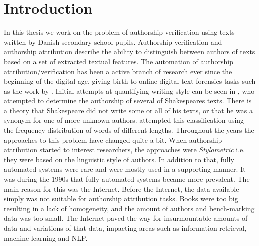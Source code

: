 %

\section{Introduction} \label{sec:introduction}


In this thesis we work on the problem of authorship verification using texts
written by Danish secondary school pupils. Authorship verification and
authorship attribution describe the ability to distinguish between authors
of texts based on a set of extracted textual features. The automation of
authorship attribution/verification has been a active branch of research ever
since the beginning of the digital age, giving birth to online digital text
forensics tasks such as the work by \citet{pan:2015}. Initial attempts at
quantifying writing style can be seen in \citet{Mendenhall237}, who attempted
to determine the authorship of several of Shakespeares texts. There is a theory
that Shakespeare did not write some or all of his texts, or that he was a
synonym for one of more unknown authors. \citet{Mendenhall237} attempted this
classification using the frequency distribution of words of different lengths.
Throughout the years the approaches to this problem have changed quite a bit.
When authorship attribution started to interest researchers, the approaches were
\textit{Stylometric} i.e. they were based on the linguistic style of authors.
In addition to that, fully automated systems were rare and were mostly used
in a supporting manner. It was during the 1990s that fully automated systems
became more prevalent. The main reason for this was the Internet. Before the
Internet, the data available simply was not suitable for authorship attribution
tasks. Books were too big resulting in a lack of homogeneity, and the amount of
authors and bench-marking data was too small. The Internet paved the way for
insurmountable amounts of data and variations of that data, impacting areas such
as information retrieval, machine learning and \gls{NLP}.

